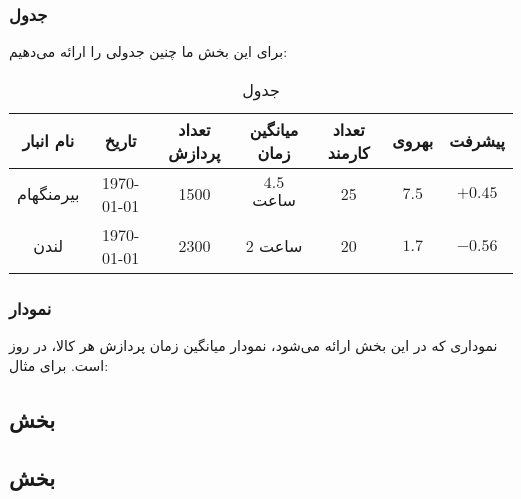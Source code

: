 \documentclass[11pt, oneside]{book}
\begin{document}
\subsubsection{جدول}
برای این بخش ما چنین جدولی را ارائه می‌دهیم:
\begin{table}[H]
\begin{center}
\caption{جدول }
\begin{adjustbox}{width=\textwidth}
\begin{tabular}{|c|c|c|c|c|c|c|}
\hline
نام انبار &
تاریخ &
تعداد پردازش &
میانگین زمان &
تعداد کارمند &
بهروی &
پیشرفت \\
\hline
\hline
بیرمنگهام &
\today &
1500 &
$4.5$ ساعت &
25 &
$7.5$ &
$+0.45$ \\
\hline
لندن &
\today &
2300 &
2 ساعت &
20 &
$1.7$ &
$-0.56$ \\
\hline
\end{tabular}
\end{adjustbox}
\end{center}
\end{table}

\subsubsection{نمودار}
نموداری که در این بخش ارائه می‌شود، نمودار میانگین زمان پردازش هر کالا، در روز است. برای مثال:

\subsection{بخش }\label{ssec:site}

\subsection{بخش }\label{ssec:shipment}
\end{document}

